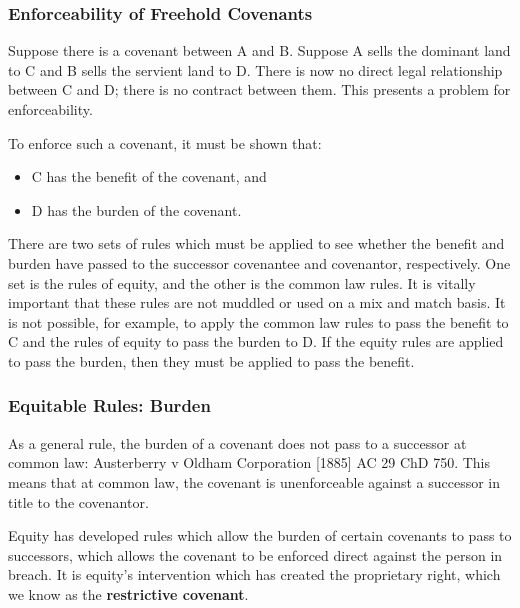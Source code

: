 \documentclass[
]{article}
\providecommand{\tightlist}{%
  \setlength{\itemsep}{0pt}\setlength{\parskip}{0pt}}
\begin{document}
\hypertarget{enforceability-of-freehold-covenants}{%
\subsubsection{Enforceability of Freehold
Covenants}\label{enforceability-of-freehold-covenants}}

Suppose there is a covenant between A and B. Suppose A sells the
dominant land to C and B sells the servient land to D. There is now no
direct legal relationship between C and D; there is no contract between
them. This presents a problem for enforceability.

To enforce such a covenant, it must be shown that:

\begin{itemize}
\tightlist
\item
  C has the benefit of the covenant, and
\item
  D has the burden of the covenant.
\end{itemize}

There are two sets of rules which must be applied to see whether the
benefit and burden have passed to the successor covenantee and
covenantor, respectively. One set is the rules of equity, and the other
is the common law rules. It is vitally important that these rules are
not muddled or used on a mix and match basis. It is not possible, for
example, to apply the common law rules to pass the benefit to C and the
rules of equity to pass the burden to D. If the equity rules are applied
to pass the burden, then they must be applied to pass the benefit.

\hypertarget{equitable-rules-burden}{%
\subsubsection{Equitable Rules: Burden}\label{equitable-rules-burden}}

As a general rule, the burden of a covenant does not pass to a successor
at common law: Austerberry v Oldham Corporation {[}1885{]} AC 29 ChD
750. This means that at common law, the covenant is unenforceable
against a successor in title to the covenantor.

Equity has developed rules which allow the burden of certain covenants
to pass to successors, which allows the covenant to be enforced direct
against the person in breach. It is equity's intervention which has
created the proprietary right, which we know as the \textbf{restrictive
covenant}.
\end{document}
